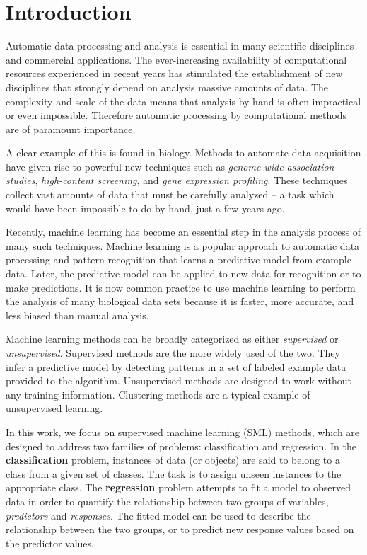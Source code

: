 \chapter{Introduction}

Automatic data processing and analysis is essential in many scientific disciplines and commercial applications. The ever-increasing availability of computational resources experienced in recent years has stimulated the establishment of new disciplines that strongly depend on analysis massive amounts of data. The complexity and scale of the data means that analysis by hand is often impractical or even impossible. Therefore automatic processing by computational methods are of paramount importance.

A clear example of this is found in biology. Methods to automate data acquisition have given rise to powerful new techniques such as \emph{genome-wide association studies}, \emph{high-content screening}, and \emph{gene expression profiling}. These techniques collect vast amounts of data that must be carefully analyzed -- a task which would have been impossible to do by hand, just a few years ago.

Recently, machine learning has become an essential step in the analysis process of many such techniques.  Machine learning is a popular approach to automatic data processing and pattern recognition that learns a predictive model from example data. Later, the predictive model can be applied to new data for recognition or to make predictions. It is now common practice to use machine learning to perform the analysis of many biological data sets because it is faster, more accurate, and less biased than manual analysis.

Machine learning methods can be broadly categorized as either \emph{supervised} or \emph{unsupervised}. Supervised methods are the more widely used of the two. They infer a predictive model by detecting patterns in a set of labeled example data provided to the algorithm. Unsupervised methods are designed to work without any training information. Clustering methods are a typical example of unsupervised learning. 

In this work, we focus on supervised machine learning (SML) methods, which are designed to address two families of problems: classification and regression. In the {\bf classification} problem, instances of data (or objects) are said to belong to a class from a given set of classes. The task is to assign unseen instances to the appropriate class. The {\bf regression} problem attempts to fit a model to observed data in order to quantify the relationship between two groups of variables, \emph{predictors} and \emph{responses}. The fitted model can be used to describe the relationship between the two groups, or to predict new response values based on the predictor values.

